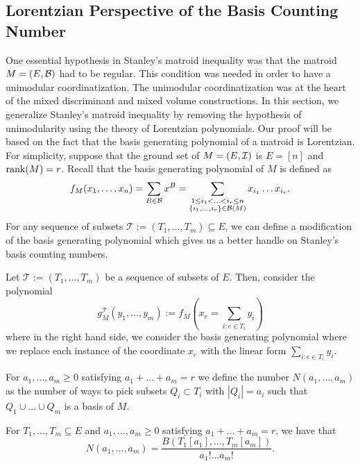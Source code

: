 \documentclass{puthesis-UG}
\begin{document}
\subsection{Lorentzian Perspective of the Basis Counting Number} \label{subsection-matroid-lorentzian-stanley-general}

One essential hypothesis in Stanley's matroid inequality was that the matroid $M = (E, \mathcal{B})$ had to be regular. This condition was needed in order to have a unimodular coordinatization. The unimodular coordinatization was at the heart of the mixed discriminant and mixed volume constructions. In this section, we generalize Stanley's matroid inequality by removing the hypothesis of unimodularity using the theory of Lorentzian polynomials. Our proof will be based on the fact that the basis generating polynomial of a matroid is Lorentzian. For simplicity, suppose that the ground set of $M = (E, \mathcal{I})$ is $E = [n]$ and $\operatorname{rank} (M) = r$. Recall that the basis generating polynomial of $M$ is defined as 
\[
	f_M(x_1, \ldots, x_n) = \sum_{B \in \mathcal{B}} x^B = \sum_{\substack{1 \leq i_1 < \ldots < i_r \leq n \\ \{i_1, \ldots, i_r\} \in \mathcal{B} (M)}} x_{i_1} \ldots x_{i_r}.
\]
For any sequence of subsets $\mathcal{T} := (T_1, \ldots, T_m) \subseteq E$, we can define a modification of the basis generating polynomial which gives us a better handle on Stanley's basis counting numbers. 

\begin{defn}
	Let $\mathcal{T} := (T_1, \ldots, T_m)$ be a sequence of subsets of $E$. Then, consider the polynomial 
	\[
		g_M^\mathcal{T} (y_1, \ldots, y_m) := f_M \left (x_e = \sum_{i : e \in T_i} y_i \right )
	\]
	where in the right hand side, we consider the basis generating polynomial where we replace each instance of the coordinate $x_e$ with the linear form $\sum_{i : e \in T_i} y_i$. 
\end{defn}

For $a_1, \ldots, a_m \geq 0$ satisfying $a_1 + \ldots + a_m = r$ we define the number $N(a_1, \ldots, a_m)$ as the number of ways to pick subsets $Q_i \subset T_i$ with $|Q_i| = a_i$ such that $Q_1 \cup \ldots \cup Q_m$ is a basis of $M$. 
\begin{lem} \label{lem-simplifying-N-to-B}
	For $T_1, \ldots, T_m \subseteq E$ and $a_1, \ldots, a_m \geq 0$ satisfying $a_1 + \ldots + a_m = r$, we have that 
	\[	
		N(a_1, \ldots, a_m) = \frac{B(T_1[a_1], \ldots, T_m[a_m])}{a_1! \ldots a_m!}.
	\]
\end{lem}
\end{document}

